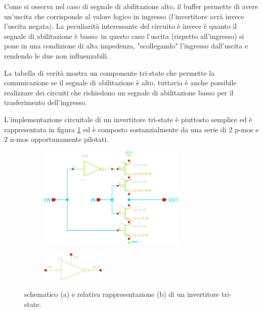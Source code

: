 	Come si osserva nel caso di segnale di abilitazione alto, il buffer permette di avere un'uscita che corrisponde al valore logico in ingresso (l'invertitore avrà invece l'uscita negata). La peculiarità interessante del circuito è invece è quanto il segnale di abilitazione è basso: in questo caso l'uscita (rispetto all'ingresso) si pone in una condizione di alta impedenza, "scollegando" l'ingresso dall'uscita e rendendo le due non influenzabili.
	
	La tabella di verità mostra un componente tri-state che permette la comunicazione se il segnale di abilitazione è alto, tuttavia è anche possibile realizzare dei circuiti che richiedono un segnale di abilitazione basso per il trasferimento dell'ingresso.
	\vspace{5mm}
	
	L'implementazione circuitale di un invertitore tri-state è piuttosto semplice ed è rappresentata in figura \ref{fig:tsi:sch} ed è composto sostanzialmente da una serie di 2 p-mos e 2 n-mos opportunamente pilotati.
	
	\begin{figure}[bht]
		\centering
		\begin{subfigure}{0.48\linewidth}
			\centering
			\includegraphics[width=7cm]{Immagini/tri-state-sch}
			\caption{}
		\end{subfigure}
		\begin{subfigure}{0.48\linewidth}
			\centering
			\includegraphics[width=3cm]{Immagini/tri-state-simple}
			\caption{}
		\end{subfigure}
		\caption{schematico (a) e relativa rappresentazione (b) di un invertitore tri-state.}
		\label{fig:tsi:sch}
	\end{figure}

